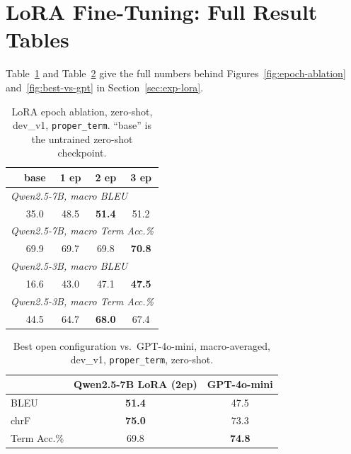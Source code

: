 \documentclass[11pt]{article}
\begin{document}
\appendix

\section{LoRA Fine-Tuning: Full Result Tables}
\label{sec:lora-tables}

Table~\ref{tab:epoch-ablation} and Table~\ref{tab:best-vs-gpt} give the full numbers behind Figures~\ref{fig:epoch-ablation} and~\ref{fig:best-vs-gpt} in Section~\ref{sec:exp-lora}.

\begin{table}[h]
  \centering
  \small
  \begin{tabular}{lcccc}
    \hline
     & \textbf{base} & \textbf{1 ep} & \textbf{2 ep} & \textbf{3 ep} \\
    \hline
    \multicolumn{5}{l}{\emph{Qwen2.5-7B, macro BLEU}} \\
    & 35.0 & 48.5 & \textbf{51.4} & 51.2 \\
    \multicolumn{5}{l}{\emph{Qwen2.5-7B, macro Term Acc.\%}} \\
    & 69.9 & 69.7 & 69.8 & \textbf{70.8} \\
    \hline
    \multicolumn{5}{l}{\emph{Qwen2.5-3B, macro BLEU}} \\
    & 16.6 & 43.0 & 47.1 & \textbf{47.5} \\
    \multicolumn{5}{l}{\emph{Qwen2.5-3B, macro Term Acc.\%}} \\
    & 44.5 & 64.7 & \textbf{68.0} & 67.4 \\
    \hline
  \end{tabular}
  \caption{LoRA epoch ablation, zero-shot, dev\_v1, \texttt{proper\_term}. ``base'' is the untrained zero-shot checkpoint.}
  \label{tab:epoch-ablation}
\end{table}

\begin{table}[h]
  \centering
  \small
  \begin{tabular}{lcc}
    \hline
    & \textbf{Qwen2.5-7B LoRA (2ep)} & \textbf{GPT-4o-mini} \\
    \hline
    BLEU & \textbf{51.4} & 47.5 \\
    chrF & \textbf{75.0} & 73.3 \\
    Term Acc.\% & 69.8 & \textbf{74.8} \\
    \hline
  \end{tabular}
  \caption{Best open configuration vs.\ GPT-4o-mini, macro-averaged, dev\_v1, \texttt{proper\_term}, zero-shot.}
  \label{tab:best-vs-gpt}
\end{table}
\end{document}
